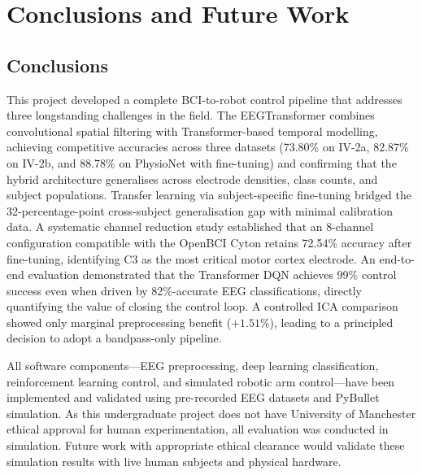 \documentclass[12pt, a4paper]{article}
\begin{document}
\section{Conclusions and Future Work}

\subsection{Conclusions}

This project developed a complete BCI-to-robot control pipeline that addresses three longstanding challenges in the field. The EEGTransformer combines convolutional spatial filtering with Transformer-based temporal modelling, achieving competitive accuracies across three datasets (73.80\% on IV-2a, 82.87\% on IV-2b, and 88.78\% on PhysioNet with fine-tuning) and confirming that the hybrid architecture generalises across electrode densities, class counts, and subject populations. Transfer learning via subject-specific fine-tuning bridged the 32-percentage-point cross-subject generalisation gap with minimal calibration data. A systematic channel reduction study established that an 8-channel configuration compatible with the OpenBCI Cyton retains 72.54\% accuracy after fine-tuning, identifying C3 as the most critical motor cortex electrode. An end-to-end evaluation demonstrated that the Transformer DQN achieves 99\% control success even when driven by 82\%-accurate EEG classifications, directly quantifying the value of closing the control loop. A controlled ICA comparison showed only marginal preprocessing benefit ($+1.51\%$), leading to a principled decision to adopt a bandpass-only pipeline.

All software components---EEG preprocessing, deep learning classification, reinforcement learning control, and simulated robotic arm control---have been implemented and validated using pre-recorded EEG datasets and PyBullet simulation. As this undergraduate project does not have University of Manchester ethical approval for human experimentation, all evaluation was conducted in simulation. Future work with appropriate ethical clearance would validate these simulation results with live human subjects and physical hardware.
\end{document}
